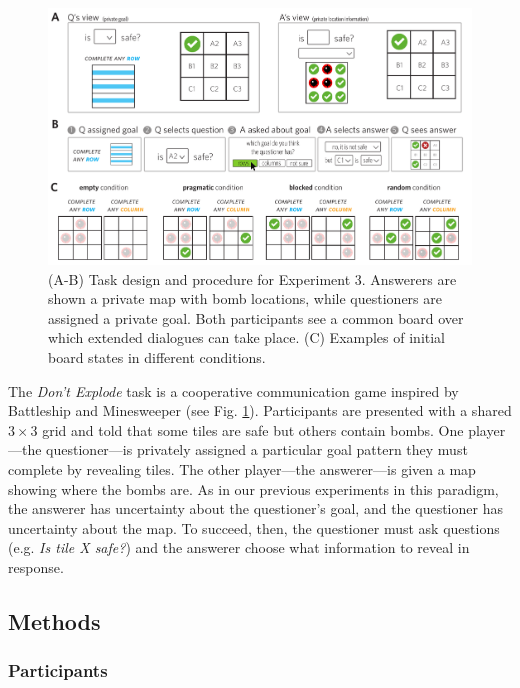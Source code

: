 \documentclass[11pt, floatsintext]{apa6}
\begin{document}
\begin{figure}[tbh!]
\begin{center}
\includegraphics[scale = .7]{Exp3/spatialDemo.pdf}
\end{center}
\caption{(A-B) Task design and procedure for Experiment 3. Answerers are shown a private map with bomb locations, while questioners are assigned a private goal. Both participants see a common board over which extended dialogues can take place. (C) Examples of initial board states in different conditions.}
\label{fig:exp3task}
\end{figure}

The \emph{Don't Explode} task is a cooperative communication game inspired by Battleship and Minesweeper (see Fig. \ref{fig:exp3task}). 
Participants are presented with a shared $3 \times 3$ grid and told that some tiles are safe but others contain bombs.
One player---the questioner---is privately assigned a particular goal pattern they must complete by revealing tiles.
The other player---the answerer---is given a map showing where the bombs are.
As in our previous experiments in this paradigm, the answerer has uncertainty about the questioner's goal, and the questioner has uncertainty about the map.
To succeed, then, the questioner must ask questions (e.g. \emph{Is tile X safe?}) and the answerer choose what information to reveal in response.

\subsection{Methods}

\subsubsection{Participants}
\end{document}
